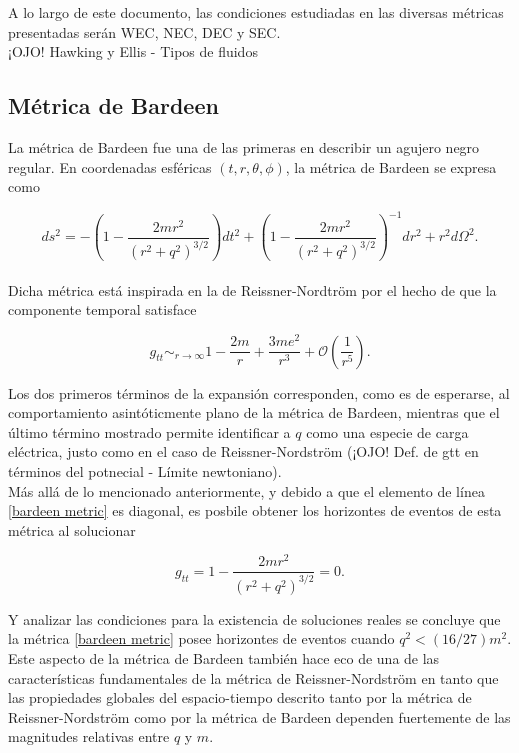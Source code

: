 \documentclass{article}
\numberwithin{equation}{section}
\begin{document}
A lo largo de este documento, las condiciones estudiadas en las diversas métricas presentadas serán WEC, NEC, DEC y SEC.\\

¡OJO! Hawking y Ellis - Tipos de fluidos

\subsection{Métrica de Bardeen}

La métrica de Bardeen \cite{bardeen,borde1994,borde1996} fue una de las primeras en describir un agujero negro regular. En coordenadas esféricas $(t,r,\theta,\phi)$, la métrica de Bardeen se expresa como

\begin{equation}
\label{bardeen metric}
ds^2 = -\left( 1 - \frac{2mr^2}{(r^2 + q^2)^{3/2}} \right)dt^2 + \left( 1 - \frac{2mr^2}{(r^2 + q^2)^{3/2}} \right)^{-1}dr^2 + r^2d\Omega^2.
\end{equation}\\

Dicha métrica está inspirada en la de Reissner-Nordtröm por el hecho de que la componente temporal satisface

\begin{equation}
g_{tt} \sim_{r \to \infty} 1 - \frac{2m}{r} + \frac{3me^2}{r^3} + \mathcal{O}\left( \frac{1}{r^5} \right).
\end{equation}

Los dos primeros términos de la expansión corresponden, como es de esperarse, al comportamiento asintóticmente plano de la métrica de Bardeen, mientras que el último término mostrado permite identificar a $q$ como una especie de carga eléctrica, justo como en el caso de Reissner-Nordström (¡OJO! Def. de gtt en términos del potnecial - Límite newtoniano).\\

Más allá de lo mencionado anteriormente, y debido a que el elemento de línea \eqref{bardeen metric} es diagonal, es posbile obtener los horizontes de eventos de esta métrica al solucionar

\begin{equation}
g_{tt} = 1 - \frac{2mr^2}{(r^2 + q^2)^{3/2}} = 0.
\end{equation}

Y analizar las condiciones para la existencia de soluciones reales se concluye que la métrica \eqref{bardeen metric} posee horizontes de eventos cuando $q^2 < (16/27)m^2$. Este aspecto de la métrica de Bardeen también hace eco de una de las características fundamentales de la métrica de Reissner-Nordström en tanto que las propiedades globales del espacio-tiempo descrito tanto por la métrica de Reissner-Nordström como por la métrica de Bardeen dependen fuertemente de las magnitudes relativas entre $q$ y $m$.\\
\end{document}
